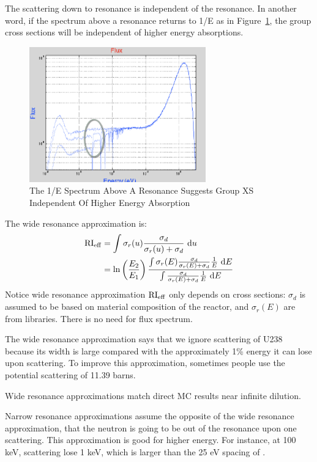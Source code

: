\documentclass{school-22.211-notes}
\begin{document}
The scattering down to resonance is independent of the resonance. In another word, if the spectrum above a resonance returns to 1/E as in Figure~\ref{1overE}, the group cross sections will be independent of higher energy absorptions. 
\begin{figure}
  \centering
  \includegraphics[width=3in]{images/resonance-1-over-E.png}
  \caption{The 1/E Spectrum Above A Resonance Suggests Group XS Independent Of Higher Energy Absorption} \label{1overE}
\end{figure}



The wide resonance approximation is: 
\begin{align}
\mathrm{RI}_{\mathrm{eff}} &= \int \sigma_r(u) \frac{\sigma_d}{\sigma_r(u) + \sigma_d} \mbox{ }\mathrm{d} u \\
&= \ln \left(\frac{E_2}{E_1} \right) \frac{ \int \sigma_r(E) \frac{\sigma_d}{\sigma_r(E) + \sigma_d} \frac{1}{E} \mbox{ }\mathrm{d} E}{ \int \frac{\sigma_d}{\sigma_r(E) + \sigma_d} \frac{1}{E} \mbox{ }\mathrm{d} E}
\end{align}
Notice wide resonance approximation $\mathrm{RI}_{\mathrm{eff}}$ only depends on cross sections: $\sigma_d$ is assumed to be based on material composition of the reactor, and $\sigma_r(E)$ are from libraries. There is no need for flux spectrum. 

The wide resonance approximation says that we ignore scattering of U238 because its width is large compared with the approximately 1\% energy it can lose upon scattering. To improve this approximation, sometimes people use the potential scattering of 11.39 barns. 

Wide resonance approximations match direct MC results near infinite dilution. 

Narrow resonance approximations assume the opposite of the wide resonance approximation, that the neutron is going to be out of the resonance upon one scattering. This approximation is good for higher energy. For instance, at 100 keV, scattering lose 1 keV, which is larger than the 25 eV spacing of . 
\end{document}
